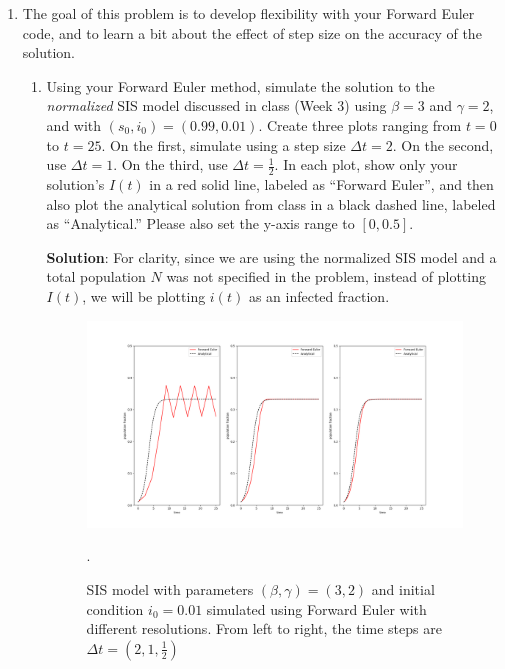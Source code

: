 \documentclass[11pt]{article}
\begin{document}
\begin{enumerate}
	\item The goal of this problem is to develop flexibility with your Forward Euler code, and to learn a bit about the effect of step size on the accuracy of the solution.
	
\begin{enumerate}[label=\alph*.]
	\item Using your Forward Euler method, simulate the solution to the {\it normalized} SIS model discussed in class (Week 3) using $\beta=3$ and $\gamma=2$, and with $(s_0, i_0) = (0.99, 0.01)$. Create three plots ranging from $t=0$ to $t=25$. On the first, simulate using a step size $\Delta t=2$. On the second, use $\Delta t =1$. On the third, use $\Delta t = \tfrac{1}{2}$. In each plot, show only your solution's $I(t)$ in a red solid line, labeled as ``Forward Euler'', and then also plot the analytical solution from class in a black dashed line, labeled as ``Analytical.'' Please also set the y-axis range to $[0,0.5]$. 
	
	\begin{tcolorbox}
		\textbf{Solution}: For clarity, since we are using the normalized SIS model and a total population $N$ was not specified in the problem, instead of plotting $I(t)$, we will be plotting $i(t)$ as an infected fraction.
	\end{tcolorbox}

	\begin{figure}[H]
		\centering
		\includegraphics[scale=0.35]{hw2p1.png}
		\caption{SIS model with parameters $(\beta, \gamma)=(3, 2)$ and initial condition $i_0=0.01$ simulated using Forward Euler with different resolutions. From left to right, the time steps are $\Delta t = (2, 1, \frac{1}{2})$}.
	\end{figure}
	

\end{enumerate}
\end{enumerate}
\end{document}

